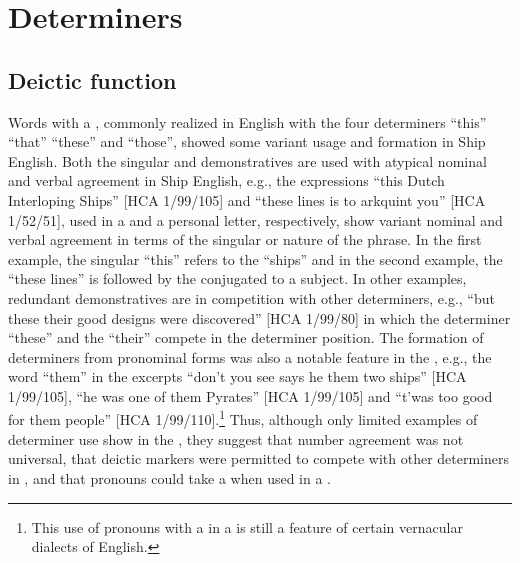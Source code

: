 \section{{Determiners}}\label{sec:5.3}

\subsection{{Deictic function}}\label{sec:5.3.1}

Words with a , commonly realized in English with the four  determiners “this” “that” “these” and “those”, showed some variant usage and formation in Ship English. Both the singular and  demonstratives are used with atypical nominal and verbal agreement in Ship English, e.g., the expressions “this Dutch Interloping Ships” [HCA 1/99/105] and “these lines is to arkquint you” [HCA 1/52/51], used in a  and a personal letter, respectively, show variant nominal and verbal agreement in terms of the singular or  nature of the  phrase. In the first example, the singular  “this” refers to the   “ships” and in the second example, the    “these lines” is followed by the   conjugated to a  subject. In other examples, redundant demonstratives are in competition with other determiners, e.g., “but these their good designs were discovered” [HCA 1/99/80] in which the determiner “these” and the  “their” compete in the determiner position. The formation of  determiners from  pronominal forms was also a notable feature in the , e.g., the word “them” in the excerpts “don’t you see says he them two ships” [HCA 1/99/105], “he was one of them Pyrates” [HCA 1/99/105] and “t’was too good for them people” [HCA 1/99/110].\footnote{This use of  pronouns with a  in a  is still a feature of certain vernacular dialects of English.} Thus, although only limited examples of determiner use show in the , they suggest that  number agreement was not universal, that deictic markers were permitted to compete with other determiners in , and that  pronouns could take a  when used in a .  

